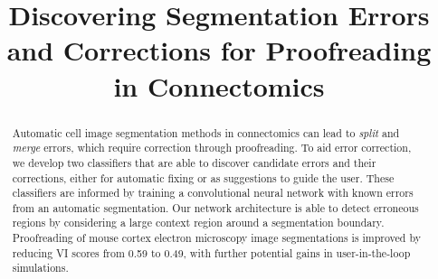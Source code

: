 \documentclass{llncs}
\begin{document}
%
\title{Discovering Segmentation Errors and Corrections for Proofreading in Connectomics}
%
%
%
%
%

\maketitle              %

\begin{abstract}
Automatic cell image segmentation methods in connectomics can lead to \emph{split} and \emph{merge} errors, which require correction through proofreading. To aid error correction, we develop two classifiers that are able to discover candidate errors and their corrections, either for automatic fixing or as suggestions to guide the user. These classifiers are informed by training a convolutional neural network with known errors from an automatic segmentation. 
Our network architecture is able to detect erroneous regions by considering a large context region around a segmentation boundary. Proofreading of mouse cortex electron microscopy image segmentations is improved by reducing VI scores from 0.59 to 0.49, with further potential gains in user-in-the-loop simulations.
\end{abstract}
%

%


%


%
%


\end{document}
